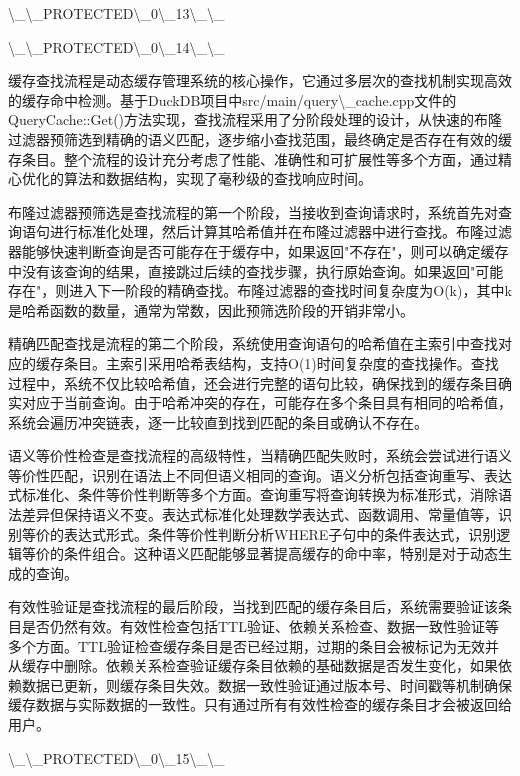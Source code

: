 \textbackslash{}_\textbackslash{}_PROTECTED\textbackslash{}_0\textbackslash{}_13\textbackslash{}_\textbackslash{}_

\textbackslash{}_\textbackslash{}_PROTECTED\textbackslash{}_0\textbackslash{}_14\textbackslash{}_\textbackslash{}_

缓存查找流程是动态缓存管理系统的核心操作，它通过多层次的查找机制实现高效的缓存命中检测。基于DuckDB项目中src/main/query\textbackslash{}_cache.cpp文件的QueryCache::Get()方法实现，查找流程采用了分阶段处理的设计，从快速的布隆过滤器预筛选到精确的语义匹配，逐步缩小查找范围，最终确定是否存在有效的缓存条目。整个流程的设计充分考虑了性能、准确性和可扩展性等多个方面，通过精心优化的算法和数据结构，实现了毫秒级的查找响应时间。

布隆过滤器预筛选是查找流程的第一个阶段，当接收到查询请求时，系统首先对查询语句进行标准化处理，然后计算其哈希值并在布隆过滤器中进行查找。布隆过滤器能够快速判断查询是否可能存在于缓存中，如果返回"不存在"，则可以确定缓存中没有该查询的结果，直接跳过后续的查找步骤，执行原始查询。如果返回"可能存在"，则进入下一阶段的精确查找。布隆过滤器的查找时间复杂度为O(k)，其中k是哈希函数的数量，通常为常数，因此预筛选阶段的开销非常小。

精确匹配查找是流程的第二个阶段，系统使用查询语句的哈希值在主索引中查找对应的缓存条目。主索引采用哈希表结构，支持O(1)时间复杂度的查找操作。查找过程中，系统不仅比较哈希值，还会进行完整的语句比较，确保找到的缓存条目确实对应于当前查询。由于哈希冲突的存在，可能存在多个条目具有相同的哈希值，系统会遍历冲突链表，逐一比较直到找到匹配的条目或确认不存在。

语义等价性检查是查找流程的高级特性，当精确匹配失败时，系统会尝试进行语义等价性匹配，识别在语法上不同但语义相同的查询。语义分析包括查询重写、表达式标准化、条件等价性判断等多个方面。查询重写将查询转换为标准形式，消除语法差异但保持语义不变。表达式标准化处理数学表达式、函数调用、常量值等，识别等价的表达式形式。条件等价性判断分析WHERE子句中的条件表达式，识别逻辑等价的条件组合。这种语义匹配能够显著提高缓存的命中率，特别是对于动态生成的查询。

有效性验证是查找流程的最后阶段，当找到匹配的缓存条目后，系统需要验证该条目是否仍然有效。有效性检查包括TTL验证、依赖关系检查、数据一致性验证等多个方面。TTL验证检查缓存条目是否已经过期，过期的条目会被标记为无效并从缓存中删除。依赖关系检查验证缓存条目依赖的基础数据是否发生变化，如果依赖数据已更新，则缓存条目失效。数据一致性验证通过版本号、时间戳等机制确保缓存数据与实际数据的一致性。只有通过所有有效性检查的缓存条目才会被返回给用户。

\textbackslash{}_\textbackslash{}_PROTECTED\textbackslash{}_0\textbackslash{}_15\textbackslash{}_\textbackslash{}_

